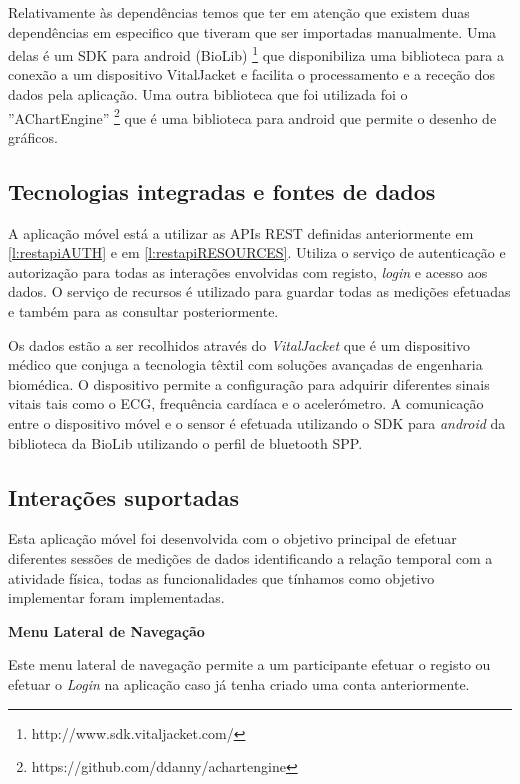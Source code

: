Relativamente às dependências temos que ter em atenção que existem duas dependências em especifico que tiveram que ser importadas manualmente. Uma delas é um \gls{SDK} para android (BioLib) \footnote{http://www.sdk.vitaljacket.com/} que disponibiliza uma biblioteca para a conexão a um dispositivo VitalJacket e facilita o processamento e a receção dos dados pela aplicação. Uma outra biblioteca que foi utilizada foi o ''AChartEngine'' \footnote{https://github.com/ddanny/achartengine} que é uma biblioteca para android que permite o desenho de gráficos.




\subsection{Tecnologias integradas e fontes de dados}
A aplicação móvel está a utilizar as \gls{API}s \gls{REST} definidas anteriormente em \ref{l:restapiAUTH} e em \ref{l:restapiRESOURCES}. Utiliza o serviço de autenticação e autorização para todas as interações envolvidas com registo, \textit{login} e acesso aos dados. O serviço de recursos é utilizado para guardar todas as medições efetuadas e também para as consultar posteriormente.\par 
Os dados estão a ser recolhidos através do \textit{VitalJacket} que é um dispositivo médico que conjuga a tecnologia têxtil com soluções avançadas de engenharia biomédica. O dispositivo permite a configuração para adquirir diferentes sinais vitais tais como o \gls{ECG}, frequência cardíaca e o acelerómetro. A comunicação entre o dispositivo móvel e o sensor é efetuada utilizando o \gls{SDK} para \textit{android} da biblioteca da BioLib utilizando o perfil de bluetooth \gls{SPP}.



\subsection{Interações suportadas }
Esta aplicação móvel foi desenvolvida com o objetivo principal de efetuar diferentes sessões de medições de dados identificando a relação temporal com a atividade física, todas as funcionalidades que tínhamos como objetivo implementar foram implementadas.


\par
\textbf{Menu Lateral de Navegação}
\par
Este menu lateral de navegação permite a um participante efetuar o registo ou efetuar o \textit{Login} na aplicação caso já tenha criado uma conta anteriormente.

